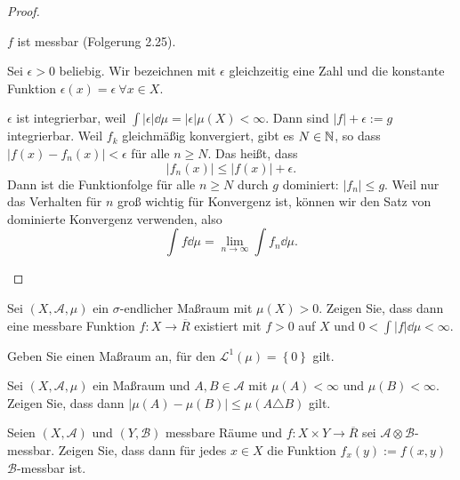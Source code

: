 \begin{proof}
	\begin{parts}
	\item $f$ ist messbar (Folgerung 2.25).

	Sei $\epsilon>0$ beliebig. Wir bezeichnen mit $\epsilon$ gleichzeitig eine Zahl und die konstante Funktion $\epsilon(x)=\epsilon~\forall x\in X$. 

	$\epsilon$ ist integrierbar, weil $\int |\epsilon|\dd{\mu}=|\epsilon|\mu(X)<\infty$. Dann sind $|f|+\epsilon:= g$ integrierbar. Weil $f_k$ gleichmäßig konvergiert, gibt es $N\in \mathbb{N}$, so dass $|f(x)-f_n(x)|<\epsilon$ f\"{u}r alle $n\ge N$. Das heißt, dass
	\[
	|f_n(x)|\le |f(x)|+\epsilon
	.\] 
	Dann ist die Funktionfolge f\"{u}r alle $n\ge N$ durch $g$ dominiert: $|f_n|\le g$. Weil nur das Verhalten f\"{u}r $n$ groß wichtig f\"{u}r Konvergenz ist, können wir den Satz von dominierte Konvergenz verwenden, also 
	\[
		\int f\dd{\mu}=\lim_{n \to \infty} \int f_n\dd{\mu}
	.\] 
	\end{parts}
\end{proof}
\begin{Problem}
	\begin{parts}
	\item Sei $(X,\mathcal{A},\mu)$ ein $\sigma$-endlicher Maßraum mit $\mu(X)>0$. Zeigen Sie, dass dann eine messbare Funktion $f:X\to \overline{R}$ existiert mit $f>0$ auf $X$ und $0<\int |f|\dd{\mu}<\infty$.
\item Geben Sie einen Maßraum an, f\"{u}r den $\mathcal{L}^1(\mu)=\left\{ 0 \right\} $ gilt.
	\end{parts}
\end{Problem}
\begin{Problem}
\begin{parts}
\item Sei $(X,\mathcal{A},\mu)$ ein Maßraum und $A,B\in \mathcal{A}$ mit $\mu(A)<\infty$ und $\mu(B)<\infty$. Zeigen Sie, dass dann $|\mu(A)-\mu(B)|\le\mu(A\triangle B)$ gilt.
\item Seien $(X,\mathcal{A})$ und $(Y,\mathcal{B})$ messbare Räume und $f:X\times Y\to \overline{R}$ sei $\mathcal{A}\otimes \mathcal{B}$-messbar. Zeigen Sie, dass dann f\"{u}r jedes $x\in X$ die Funktion $f_x(y):=f(x,y)$ $\mathcal{B}$-messbar ist.
\end{parts}
\end{Problem}
